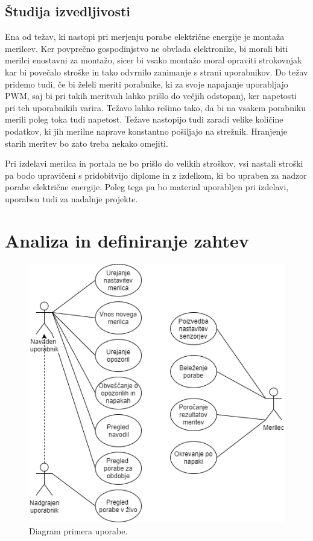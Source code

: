 \documentclass[12pt,a4paper,titlepage,openany]{report}
\begin{document}
\section{Študija izvedljivosti}
\thispagestyle{fancy}
Ena od težav, ki nastopi pri merjenju porabe električne energije je montaža merilcev. Ker povprečno gospodinjstvo ne obvlada elektronike, bi morali biti merilci enostavni za montažo, sicer bi vsako montažo moral opraviti strokovnjak kar bi povečalo stroške in tako odvrnilo zanimanje s strani uporabnikov. Do težav pridemo tudi, če bi želeli meriti porabnike, ki za svoje napajanje uporabljajo PWM, saj bi pri takih meritvah lahko prišlo do večjih odstopanj, ker napetosti pri teh uporabnikih varira. Težavo lahko rešimo tako, da bi na vsakem porabniku merili poleg toka tudi napetost. Težave nastopijo tudi zaradi velike količine podatkov, ki jih merilne naprave konstantno pošiljajo na strežnik. Hranjenje starih meritev bo zato treba nekako omejiti. 

Pri izdelavi merilca in portala ne bo prišlo do velikih stroškov, vsi nastali stroški pa bodo upravičeni s pridobitvijo diplome in z izdelkom, ki bo upraben za nadzor porabe električne energije. Poleg tega pa bo material uporabljen pri izdelavi, uporaben tudi za nadalnje projekte.

\chapter{Analiza in definiranje zahtev}
\thispagestyle{fancy}

\begin{figure}[H]
\begin{center}
\includegraphics[width=1\textwidth, height=0.9\textheight,keepaspectratio]{Slike/UseCase.png}
\end{center}
\caption{Diagram primera uporabe.}\label{slika:UseCase}
\end{figure}
\end{document}
